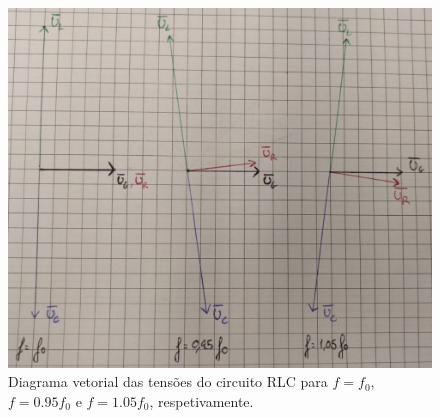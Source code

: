 \documentclass[a4paper, titlepage, portuguese]{article}
\begin{document}
	\subsubsection{}
		\begin{figure}[h]
			\centering
			\includegraphics[width=0.6\linewidth]{diag_vect.jpeg}
			\caption{Diagrama vetorial das tensões do circuito RLC para $f = f_0$, $f = 0.95f_0$ e $f = 1.05f_0$, respetivamente.}
			\label{fig:figure-example}
		\end{figure}


\end{document}
